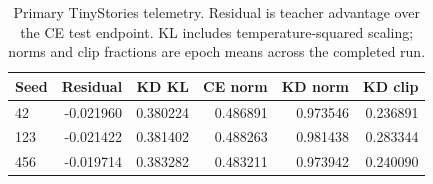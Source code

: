 \begingroup\small
\setlength{\tabcolsep}{5pt}
\begin{table}[htbp]\centering
\begin{tabular}{lrrrrr}
\toprule
Seed & Residual & KD KL & CE norm & KD norm & KD clip \\
\midrule
42 & -0.021960 & 0.380224 & 0.486891 & 0.973546 & 0.236891 \\
123 & -0.021422 & 0.381402 & 0.488263 & 0.981438 & 0.283344 \\
456 & -0.019714 & 0.383282 & 0.483211 & 0.973942 & 0.240090 \\
\bottomrule
\end{tabular}
\caption{Primary TinyStories telemetry. Residual is teacher advantage over the CE test endpoint. KL includes temperature-squared scaling; norms and clip fractions are epoch means across the completed run.}\label{tab:tinystories_optimization}
\end{table}
\endgroup
